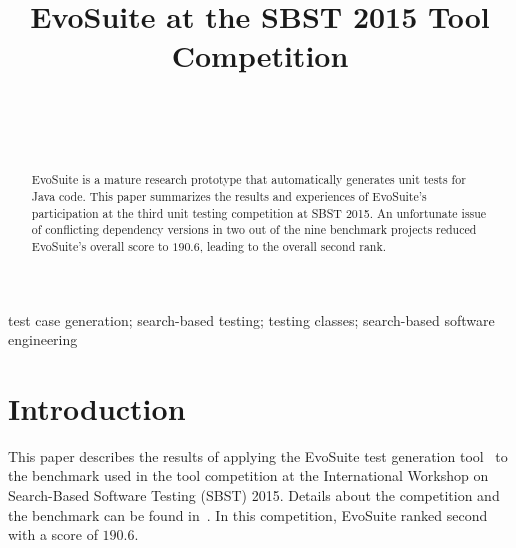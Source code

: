 \documentclass[10pt,conference,compsocconf]{IEEEtran}
\newcommand{\EVOSUITE}{{\sc EvoSuite}\xspace}
\begin{document}
\title{EvoSuite at the SBST 2015 Tool Competition}

\author{
\\
\and
{}
\\
}

\maketitle

\begin{abstract}
  \EVOSUITE is a mature research prototype that automatically
  generates unit tests for Java code.  This paper summarizes the
  results and experiences of \EVOSUITE's participation at the third
  unit testing competition at SBST 2015. An unfortunate issue of
  conflicting dependency versions in two out of the nine benchmark
  projects reduced \EVOSUITE's overall score to $190.6$, leading to
  the overall second rank.
\end{abstract}

\begin{IEEEkeywords}
  test case generation; search-based testing; testing classes;
  search-based software engineering
\end{IEEEkeywords}


\section{Introduction}

This paper describes the results of applying the \EVOSUITE test
generation tool~\cite{FrA11c} to the benchmark used in the tool
competition at the International Workshop on Search-Based Software
Testing (SBST) 2015.  Details about the competition and the benchmark
can be found in~\cite{sbst2015}. In this competition, \EVOSUITE ranked
second with a score of $190.6$.
\end{document}
